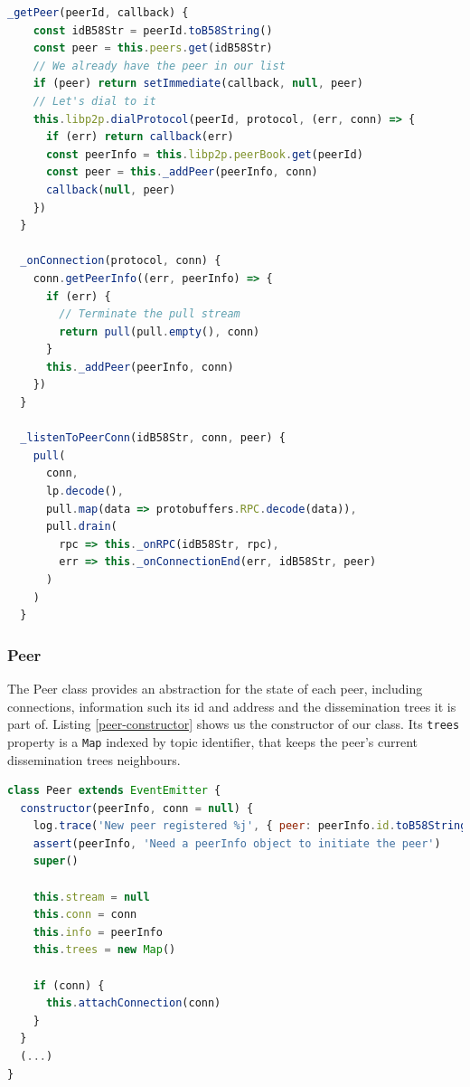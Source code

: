 \begin{lstlisting}[language=JavaScript, float=p, caption={Pulsarcast internal peer and connection handlers. These methods abstract the logic of connection handling to all the other parts of the Pulsarcast system.},label={pulsarcast-connection-handlers}]
  _getPeer(peerId, callback) {
    const idB58Str = peerId.toB58String()
    const peer = this.peers.get(idB58Str)
    // We already have the peer in our list
    if (peer) return setImmediate(callback, null, peer)
    // Let's dial to it
    this.libp2p.dialProtocol(peerId, protocol, (err, conn) => {
      if (err) return callback(err)
      const peerInfo = this.libp2p.peerBook.get(peerId)
      const peer = this._addPeer(peerInfo, conn)
      callback(null, peer)
    })
  }

  _onConnection(protocol, conn) {
    conn.getPeerInfo((err, peerInfo) => {
      if (err) {
        // Terminate the pull stream
        return pull(pull.empty(), conn)
      }
      this._addPeer(peerInfo, conn)
    })
  }

  _listenToPeerConn(idB58Str, conn, peer) {
    pull(
      conn,
      lp.decode(),
      pull.map(data => protobuffers.RPC.decode(data)),
      pull.drain(
        rpc => this._onRPC(idB58Str, rpc),
        err => this._onConnectionEnd(err, idB58Str, peer)
      )
    )
  }
\end{lstlisting}

\subsubsection{Peer}\label{subsubsec:peer}

The Peer class provides an abstraction for the state of each peer, including
connections, information such its \acrshort{id} and address and the
dissemination trees it is part of. Listing \ref{peer-constructor} shows us the
constructor of our class. Its \verb|trees| property is a \verb|Map| indexed by
topic identifier, that keeps the peer's current dissemination trees neighbours.

\begin{lstlisting}[language=JavaScript, float=p, caption={Peer class constructor},label={peer-constructor}]
class Peer extends EventEmitter {
  constructor(peerInfo, conn = null) {
    log.trace('New peer registered %j', { peer: peerInfo.id.toB58String() })
    assert(peerInfo, 'Need a peerInfo object to initiate the peer')
    super()

    this.stream = null
    this.conn = conn
    this.info = peerInfo
    this.trees = new Map()

    if (conn) {
      this.attachConnection(conn)
    }
  }
  (...)
}
\end{lstlisting}

